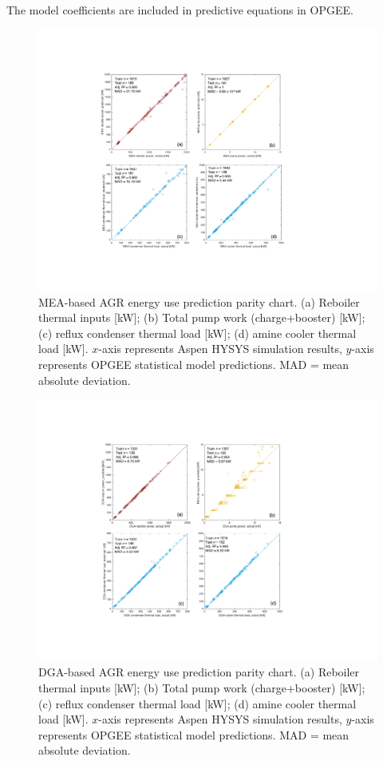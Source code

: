 \documentclass[11pt]{report}
\begin{document}
The model coefficients are included in predictive equations in OPGEE. 

\begin{figure}
\includegraphics[width=1\columnwidth]{images/MEA_comb.pdf}
\caption{MEA-based AGR energy use prediction parity chart. (a) Reboiler thermal inputs [kW]; (b) Total pump work (charge+booster) [kW]; (c) reflux condenser thermal load [kW]; (d) amine cooler thermal load [kW]. $x$-axis represents Aspen HYSYS simulation results, $y$-axis represents OPGEE statistical model predictions. MAD = mean absolute deviation.}
\label{fig:AGR_resid_MEA}
\end{figure}

\begin{figure}
\includegraphics[width=1\columnwidth]{images/DGA_comb.pdf}
\caption{DGA-based AGR energy use prediction parity chart. (a) Reboiler thermal inputs [kW]; (b) Total pump work (charge+booster) [kW]; (c) reflux condenser thermal load [kW]; (d) amine cooler thermal load [kW]. $x$-axis represents Aspen HYSYS simulation results, $y$-axis represents OPGEE statistical model predictions. MAD = mean absolute deviation.}
\label{fig:AGR_resid_DGA}
\end{figure}
\end{document}
